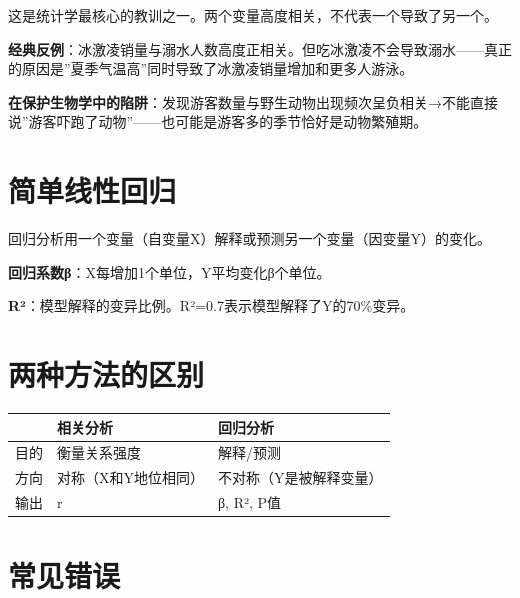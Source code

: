 \documentclass[
  letterpaper,
]{scrbook}
\newcounter{none} %
\begin{document}
这是统计学最核心的教训之一。两个变量高度相关，不代表一个导致了另一个。

\begin{tcolorbox}[enhanced jigsaw, arc=.35mm, bottomrule=.15mm, bottomtitle=1mm, breakable, colback=white, colbacktitle=quarto-callout-warning-color!10!white, colframe=quarto-callout-warning-color-frame, coltitle=black, left=2mm, leftrule=.75mm, opacityback=0, opacitybacktitle=0.6, rightrule=.15mm, title=\textcolor{quarto-callout-warning-color}{\faExclamationTriangle}\hspace{0.5em}{Warning}, titlerule=0mm, toprule=.15mm, toptitle=1mm]

\textbf{经典反例}：冰激凌销量与溺水人数高度正相关。但吃冰激凌不会导致溺水------真正的原因是''夏季气温高''同时导致了冰激凌销量增加和更多人游泳。

\end{tcolorbox}

\textbf{在保护生物学中的陷阱}：发现游客数量与野生动物出现频次呈负相关→不能直接说''游客吓跑了动物''------也可能是游客多的季节恰好是动物繁殖期。

\section{简单线性回归}\label{ux7b80ux5355ux7ebfux6027ux56deux5f52}

回归分析用一个变量（自变量X）解释或预测另一个变量（因变量Y）的变化。

\textbf{回归系数β}：X每增加1个单位，Y平均变化β个单位。

\textbf{R²}：模型解释的变异比例。R²=0.7表示模型解释了Y的70\%变异。

\section{两种方法的区别}\label{ux4e24ux79cdux65b9ux6cd5ux7684ux533aux522b}

{\def\LTcaptype{none} %
\begin{longtable}[]{@{}lll@{}}
\toprule\noalign{}
& 相关分析 & 回归分析 \\
\midrule\noalign{}
\endhead
\bottomrule\noalign{}
\endlastfoot
目的 & 衡量关系强度 & 解释/预测 \\
方向 & 对称（X和Y地位相同） & 不对称（Y是被解释变量） \\
输出 & r & β, R², P值 \\
\end{longtable}
}

\section{常见错误}\label{ux5e38ux89c1ux9519ux8bef-8}
\end{document}
